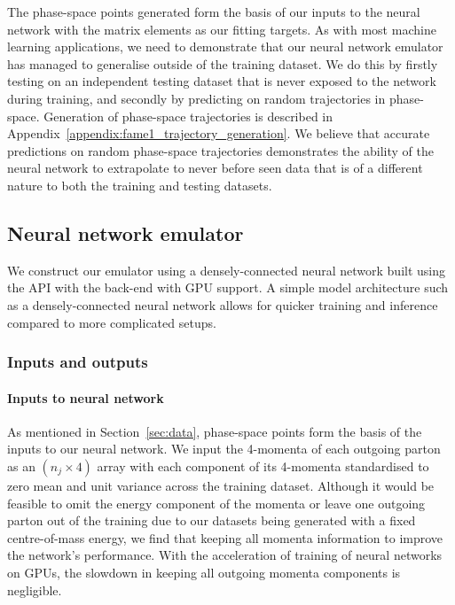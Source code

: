 \documentclass[main.tex]{subfiles}
\begin{document}
The phase-space points generated form the basis of our inputs to the neural network with the matrix elements as our fitting targets.
As with most machine learning applications, we need to demonstrate that our neural network emulator has managed to generalise outside of the training dataset.
We do this by firstly testing on an independent testing dataset that is never exposed to the network during training, and secondly by predicting on random trajectories in phase-space.
Generation of phase-space trajectories is described in Appendix~\ref{appendix:fame1_trajectory_generation}.
We believe that accurate predictions on random phase-space trajectories demonstrates the ability of the neural network to extrapolate to never before seen data 
that is of a different nature to both the training and testing datasets.

\subsection{Neural network emulator}\label{sec:network}
We construct our emulator using a densely-connected neural network built using the {\Keras} API \cite{chollet2015keras} with the {\TensorFlow} back-end \cite{tensorflow2015-whitepaper} with GPU support. A simple model architecture such as a densely-connected neural network allows for quicker training and inference compared to more complicated setups.
\subsubsection{Inputs and outputs}\label{sec:input_outputs}
\paragraph*{Inputs to neural network}
As mentioned in Section~\ref{sec:data}, phase-space points form the basis of the inputs to our neural network.
We input the 4-momenta of each outgoing parton as an $(n_{j} \times 4)$ array with each component of its 4-momenta standardised to zero mean and unit variance across the training dataset.
Although it would be feasible to omit the energy component of the momenta or leave one outgoing parton out of the training due to our datasets being generated with a fixed centre-of-mass energy, 
we find that keeping all momenta information to improve the network's performance.
With the acceleration of training of neural networks on GPUs, the slowdown in keeping all outgoing momenta components is negligible.
\end{document}
